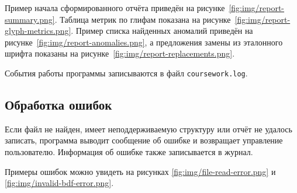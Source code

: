 Пример начала сформированного отчёта приведён на рисунке~\ref{fig:img/report-summary.png}. Таблица метрик по глифам показана на рисунке~\ref{fig:img/report-glyph-metrics.png}. Пример списка найденных аномалий приведён на рисунке~\ref{fig:img/report-anomalies.png}, а предложения замены из эталонного шрифта показаны на рисунке~\ref{fig:img/report-replacements.png}.

События работы программы записываются в файл \texttt{coursework.log}.

\subsection{Обработка ошибок}

Если файл не найден, имеет неподдерживаемую структуру или отчёт не удалось записать, программа выводит сообщение об ошибке и возвращает управление пользователю. Информация об ошибке также записывается в журнал.

Примеры ошибок можно увидеть на рисунках \ref{fig:img/file-read-error.png} и \ref{fig:img/invalid-bdf-error.png}.

\newpage
